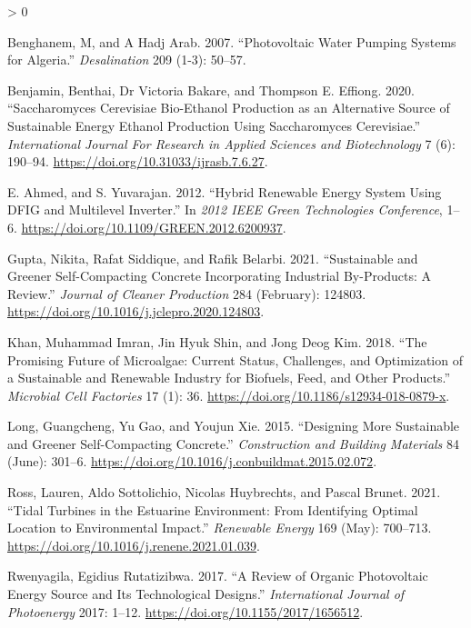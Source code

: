 \documentclass[
]{book}
\newlength{\cslhangindent}
\newenvironment{CSLReferences}[2] %
 {%
  \setlength{\parindent}{0pt}
  \ifodd #1 \everypar{\setlength{\hangindent}{\cslhangindent}}\ignorespaces\fi
  \ifnum #2 > 0
  \setlength{\parskip}{#2\baselineskip}
  \fi
 }%
 {}
\begin{document}
\begin{CSLReferences}{1}{0}
\leavevmode\hypertarget{ref-benghanem2007}{}%
Benghanem, M, and A Hadj Arab. 2007. {``Photovoltaic Water Pumping Systems for {Algeria}.''} \emph{Desalination} 209 (1-3): 50--57.

\leavevmode\hypertarget{ref-benjamin2020}{}%
Benjamin, Benthai, Dr Victoria Bakare, and Thompson E. Effiong. 2020. {``Saccharomyces Cerevisiae {Bio}-{Ethanol Production} as an {Alternative Source} of {Sustainable Energy Ethanol Production} Using {Saccharomyces} Cerevisiae.''} \emph{International Journal For Research in Applied Sciences and Biotechnology} 7 (6): 190--94. \url{https://doi.org/10.31033/ijrasb.7.6.27}.

\leavevmode\hypertarget{ref-e.ahmed2012}{}%
E. Ahmed, and S. Yuvarajan. 2012. {``Hybrid {Renewable Energy System Using DFIG} and {Multilevel Inverter}.''} In \emph{2012 {IEEE Green Technologies Conference}}, 1--6. \url{https://doi.org/10.1109/GREEN.2012.6200937}.

\leavevmode\hypertarget{ref-gupta2021}{}%
Gupta, Nikita, Rafat Siddique, and Rafik Belarbi. 2021. {``Sustainable and {Greener Self}-{Compacting Concrete} Incorporating {Industrial By}-{Products}: A {Review}.''} \emph{Journal of Cleaner Production} 284 (February): 124803. \url{https://doi.org/10.1016/j.jclepro.2020.124803}.

\leavevmode\hypertarget{ref-khan2018}{}%
Khan, Muhammad Imran, Jin Hyuk Shin, and Jong Deog Kim. 2018. {``The Promising Future of Microalgae: Current Status, Challenges, and Optimization of a Sustainable and Renewable Industry for Biofuels, Feed, and Other Products.''} \emph{Microbial Cell Factories} 17 (1): 36. \url{https://doi.org/10.1186/s12934-018-0879-x}.

\leavevmode\hypertarget{ref-long2015}{}%
Long, Guangcheng, Yu Gao, and Youjun Xie. 2015. {``Designing More Sustainable and Greener Self-Compacting Concrete.''} \emph{Construction and Building Materials} 84 (June): 301--6. \url{https://doi.org/10.1016/j.conbuildmat.2015.02.072}.

\leavevmode\hypertarget{ref-ross2021}{}%
Ross, Lauren, Aldo Sottolichio, Nicolas Huybrechts, and Pascal Brunet. 2021. {``Tidal Turbines in the Estuarine Environment: From Identifying Optimal Location to Environmental Impact.''} \emph{Renewable Energy} 169 (May): 700--713. \url{https://doi.org/10.1016/j.renene.2021.01.039}.

\leavevmode\hypertarget{ref-rwenyagila2017}{}%
Rwenyagila, Egidius Rutatizibwa. 2017. {``A {Review} of {Organic Photovoltaic Energy Source} and {Its Technological Designs}.''} \emph{International Journal of Photoenergy} 2017: 1--12. \url{https://doi.org/10.1155/2017/1656512}.


\end{CSLReferences}
\end{document}
